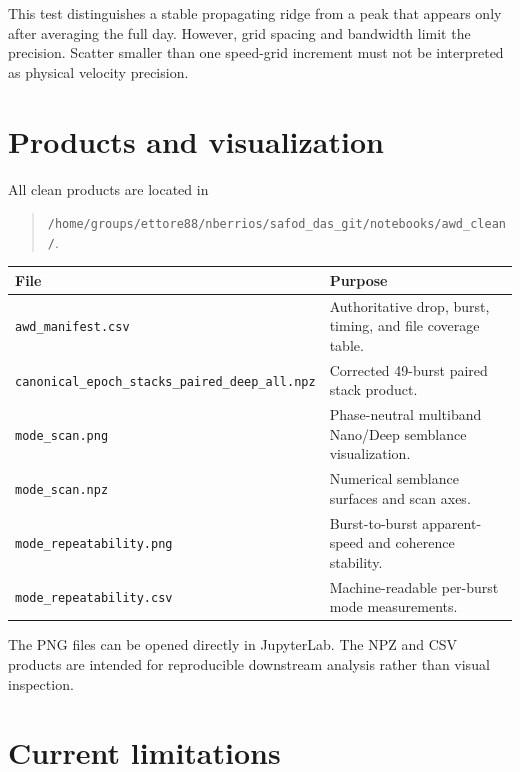 \documentclass[11pt]{article}
\newcommand{\code}[1]{\texttt{#1}}
\begin{document}
This test distinguishes a stable propagating ridge from a peak that appears
only after averaging the full day.  However, grid spacing and bandwidth limit
the precision.  Scatter smaller than one speed-grid increment must not be
interpreted as physical velocity precision.

\section{Products and visualization}

All clean products are located in
\begin{quote}
\code{/home/groups/ettore88/nberrios/safod\_das\_git/notebooks/awd\_clean/}.
\end{quote}

\begin{center}
\begin{tabular}{p{}p{}}
\toprule
File & Purpose\\
\midrule
\code{awd\_manifest.csv} & Authoritative drop, burst, timing, and file coverage table.\\
\code{canonical\_epoch\_stacks\_paired\_deep\_all.npz} & Corrected 49-burst paired stack product.\\
\code{mode\_scan.png} & Phase-neutral multiband Nano/Deep semblance visualization.\\
\code{mode\_scan.npz} & Numerical semblance surfaces and scan axes.\\
\code{mode\_repeatability.png} & Burst-to-burst apparent-speed and coherence stability.\\
\code{mode\_repeatability.csv} & Machine-readable per-burst mode measurements.\\
\bottomrule
\end{tabular}
\end{center}

The PNG files can be opened directly in JupyterLab.  The NPZ and CSV products
are intended for reproducible downstream analysis rather than visual inspection.

\section{Current limitations}
\end{document}
